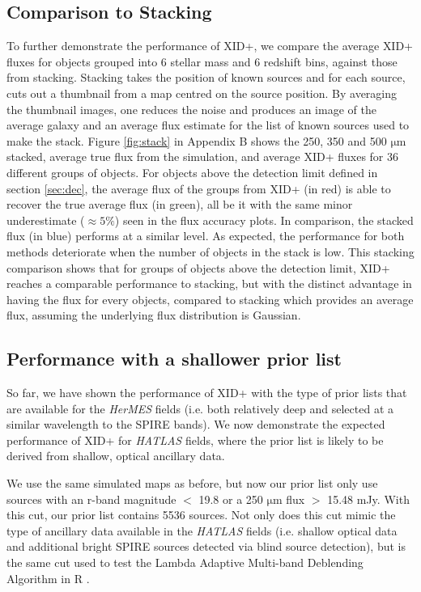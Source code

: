 \documentclass[useAMS,usenatbib]{mnras}
\begin{document}
\subsection{Comparison to Stacking}
To further demonstrate the performance of \textsc{XID+}, we compare the average \textsc{XID+} fluxes for objects grouped into 6 stellar mass and 6 redshift bins, against those from stacking. Stacking takes the position of known sources and for each source, cuts out a thumbnail from a map centred on the source position. By averaging the thumbnail images, one reduces the noise and produces an image of the average galaxy and an average flux estimate for the list of known sources used to make the stack. Figure \ref{fig:stack} in Appendix B shows the 250, 350 and 500 $\mathrm{\mu m}$ stacked, average true flux from the simulation, and average \textsc{XID+} fluxes for 36 different groups of objects. For objects above the detection limit defined in section \ref{sec:dec}, the average flux of the groups from \textsc{XID+} (in red) is able to recover the true average flux (in green), all be it with the same minor underestimate ($\approx 5 \%$) seen in the flux accuracy plots. In comparison, the stacked flux (in blue) performs at a similar level. As expected, the performance for both methods deteriorate when the number of objects in the stack is low. This stacking comparison shows that for groups of objects above the detection limit, \textsc{XID+} reaches a comparable performance to stacking, but with the distinct advantage in having the flux for every objects, compared to stacking which provides an average flux, assuming the underlying flux distribution is Gaussian.


\subsection{Performance with a shallower prior list}
So far, we have shown the performance of \textsc{XID+} with the type of prior lists that are available for the \emph{HerMES} fields (i.e. both relatively deep and selected at a similar wavelength to the SPIRE bands). We now demonstrate the expected performance of \textsc{XID+} for \emph{HATLAS} fields, where the prior list is likely to be derived from shallow, optical ancillary data.

We use the same simulated maps as before, but now our prior list only use sources with an r-band magnitude $<$ 19.8 or a 250 $\mathrm{\mu m}$ flux $>$ 15.48 mJy. With this cut, our prior list contains 5536 sources. Not only does this cut mimic the type of ancillary data available in the \emph{HATLAS} fields (i.e. shallow optical data and additional bright SPIRE sources detected via blind source detection), but is the same cut used to test the Lambda Adaptive Multi-band Deblending Algorithm in R \citep[LAMBDAR][]{Wright:2016}.
\end{document}
